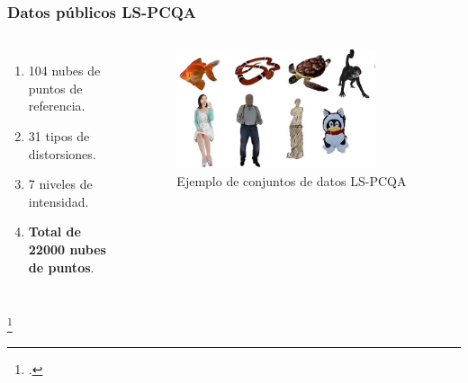 \begin{frame}
\frametitle{Datos públicos LS-PCQA}
  \begin{columns}
    \begin{enumerate}[<+->]
      \item \alert{104 nubes de puntos} de referencia.  
      \item \alert{31} tipos de \alert{distorsiones}.
      \item \alert{7 niveles} de intensidad.
      \item \textbf{Total de 22000 nubes de puntos}.
    \end{enumerate}
    \begin{figure}
      \includegraphics[width=0.8\textwidth]{imagenes/chapter3/LSPCQA}
      \caption{Ejemplo de conjuntos de datos LS-PCQA\footnotemark}
      \label{fig:LSSJTU}
    \end{figure}
  \end{columns}
  \footcitetext{ResSCNN}
\end{frame}

